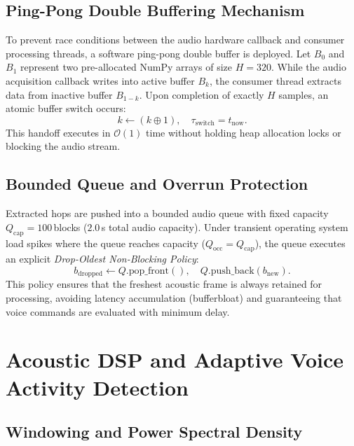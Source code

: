 \documentclass[10pt,twocolumn,letterpaper]{article}
\begin{document}
\subsection{Ping-Pong Double Buffering Mechanism}

To prevent race conditions between the audio hardware callback and consumer processing threads, a software ping-pong double buffer is deployed. Let $B_0$ and $B_1$ represent two pre-allocated NumPy arrays of size $H = 320$. While the audio acquisition callback writes into active buffer $B_k$, the consumer thread extracts data from inactive buffer $B_{1-k}$. Upon completion of exactly $H$ samples, an atomic buffer switch occurs:
\begin{equation}
    k \leftarrow (k \oplus 1), \quad \tau_{\text{switch}} = t_{\text{now}}.
\end{equation}
This handoff executes in $\mathcal{O}(1)$ time without holding heap allocation locks or blocking the audio stream.

\subsection{Bounded Queue and Overrun Protection}

Extracted hops are pushed into a bounded audio queue with fixed capacity $Q_{\text{cap}} = 100$\,blocks ($2.0$\,s total audio capacity). Under transient operating system load spikes where the queue reaches capacity ($Q_{\text{occ}} = Q_{\text{cap}}$), the queue executes an explicit \textit{Drop-Oldest Non-Blocking Policy}:
\begin{equation}
    b_{\text{dropped}} \leftarrow Q.\text{pop\_front}(), \quad Q.\text{push\_back}(b_{\text{new}}).
\end{equation}
This policy ensures that the freshest acoustic frame is always retained for processing, avoiding latency accumulation (bufferbloat) and guaranteeing that voice commands are evaluated with minimum delay.

\section{Acoustic DSP and Adaptive Voice Activity Detection}

\subsection{Windowing and Power Spectral Density}
\end{document}
